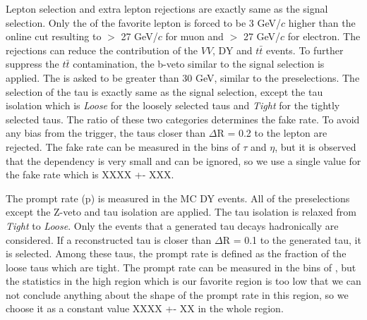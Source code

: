 Lepton selection and extra lepton rejections are exactly same as the signal selection. Only the \pt of the favorite lepton is forced to 
be 3 GeV/$c$ higher than the online cut resulting to \pt $>$ 27 GeV/$c$ for muon and \pt $>$ 27 GeV/$c$ for electron.
The rejections can reduce the contribution of the $VV$, DY and $t\bar{t}$ events. To further suppress the $t\bar{t}$ contamination, the b-veto 
similar to the signal selection is applied. The \MET is asked to be greater than 30 GeV, similar to the preselections. The selection of the tau is 
exactly same as the signal selection, except the tau isolation which is {\it Loose} for the loosely selected taus and {\it Tight} for the 
tightly selected taus.
The ratio of these two categories determines the fake rate. To avoid any bias from the trigger, the taus closer than $\Delta$R = 0.2 to the 
lepton are rejected. 
The fake rate can be measured in the bins of $\tau$ \pt and $\eta$, but it is observed that the dependency is very small and can be ignored, 
so we use a single value for the fake rate which is XXXX +- XXX.

The prompt rate (p) is measured in the MC DY events. All of the preselections except the Z-veto and tau isolation are applied. The tau isolation 
is relaxed from {\it Tight} to {\it Loose}. Only the events that a generated tau decays hadronically are considered. If a reconstructed tau is 
closer than $\Delta$R = 0.1 to the generated tau, it is selected. Among these taus, the prompt rate is defined as the fraction of the loose taus 
which are tight. The prompt rate can be measured in the bins of \mttwo, but the statistics in the high \mttwo region which is our favorite 
region is too low that we can not conclude anything about the shape of the prompt rate in this region, so we choose it as a constant value
XXXX +- XX in the whole \mttwo region.



